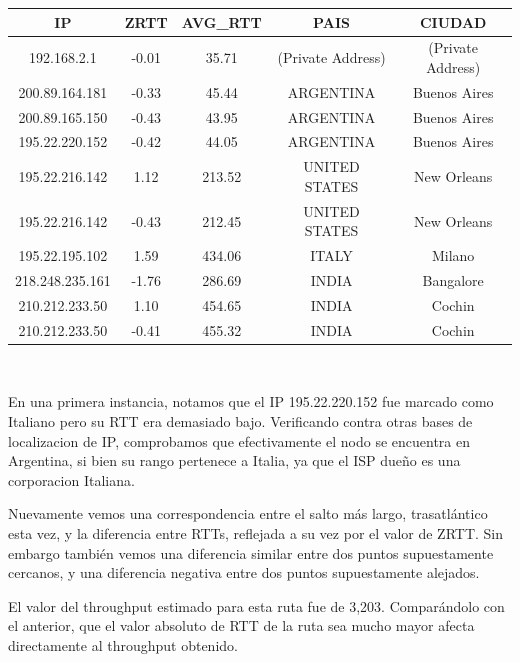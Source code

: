 \begin{tabular}{|c@{\hspace{5ex}}c@{\hspace{5ex}}c@{\hspace{5ex}}c@{\hspace{5ex}}c|}
 \hline
 \rule{0pt}{1.2em}IP & ZRTT & AVG\_RTT & PAIS & CIUDAD\\[0.2em]
 \hline

\rule{0pt}{1.2em} 192.168.2.1  &  -0.01 & 35.71 & (Private Address) & (Private Address) \\[0.2em]
\rule{0pt}{1.2em} 200.89.164.181  &  -0.33 & 45.44 & ARGENTINA & Buenos Aires \\[0.2em]
\rule{0pt}{1.2em} 200.89.165.150  &  -0.43 & 43.95 & ARGENTINA & Buenos Aires \\[0.2em]
\rule{0pt}{1.2em} 195.22.220.152  &  -0.42 & 44.05 & ARGENTINA & Buenos Aires \\[0.2em]
\rule{0pt}{1.2em} 195.22.216.142  &  1.12 & 213.52 & UNITED STATES & New Orleans \\[0.2em]
\rule{0pt}{1.2em} 195.22.216.142  &  -0.43 & 212.45 & UNITED STATES & New Orleans \\[0.2em]
\rule{0pt}{1.2em} 195.22.195.102  &  1.59 & 434.06 & ITALY & Milano \\[0.2em]
\rule{0pt}{1.2em} 218.248.235.161  &  -1.76 & 286.69 & INDIA & Bangalore \\[0.2em]
\rule{0pt}{1.2em} 210.212.233.50  &  1.10 & 454.65 & INDIA & Cochin \\[0.2em]
\rule{0pt}{1.2em} 210.212.233.50  &  -0.41 & 455.32 & INDIA & Cochin \\[0.2em]
\hline
 \end{tabular}

~

En una primera instancia, notamos que el IP 195.22.220.152 fue marcado como Italiano pero su RTT era demasiado bajo. Verificando contra otras bases de localizacion de IP, comprobamos que efectivamente el nodo se encuentra en Argentina, si bien su rango pertenece a Italia, ya que el ISP dueño es una corporacion Italiana.

Nuevamente vemos una correspondencia entre el salto más largo, trasatlántico esta vez, y la diferencia entre RTTs, reflejada a su vez por el valor de ZRTT. Sin embargo también vemos una diferencia similar entre dos puntos supuestamente cercanos, y una diferencia negativa entre dos puntos supuestamente alejados.

El valor del throughput estimado para esta ruta fue de 3,203. Comparándolo con el anterior, que el valor absoluto de RTT de la ruta sea mucho mayor afecta directamente al throughput obtenido.

